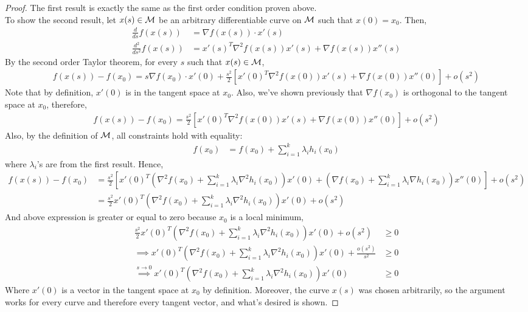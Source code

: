 \documentclass{article}
\begin{document}
   	\begin{proof}
   		The first result is exactly the same as the first order condition proven above. \\
   		To show the second result, let $x(s) \in \mathcal{{M}}$ be an arbitrary differentiable curve on $\mathcal{{M}}$ such that $x(0) = x_0$. Then,
   		\begin{align}
   			\frac{d}{ds} f(x(s)) &= \nabla f(x(s)) \cdot x'(s) \\
   			\frac{d^2}{ds^2} f(x(s)) &= x'(s)^T \nabla^2 f(x(s)) x'(s) + \nabla f(x(s)) x''(s)
   		\end{align}
   		By the second order Taylor theorem, for every $s$ such that $x(s) \in \mathcal{{M}}$, 
   		\begin{align}
   			f(x(s)) - f(x_0) = s \nabla f(x_0) \cdot x'(0) + \frac{s^2}{2} \left[
   			x'(0)^T \nabla^2 f(x(0)) x'(s) + \nabla f(x(0)) x''(0)
   			\right] + o(s^2)
   		\end{align}
   		Note that by definition, $x'(0)$ is in the tangent space at $x_0$. Also, we've shown previously that $\nabla f(x_0)$ is orthogonal to the tangent space at $x_0$, therefore,
   		\begin{align}
   			f(x(s)) - f(x_0) = \frac{s^2}{2} \left[
   			x'(0)^T \nabla^2 f(x(0)) x'(s) + \nabla f(x(0)) x''(0)
   			\right] + o(s^2)
   		\end{align}
   		Also, by the definition of $\mathcal{{M}}$, all constraints hold with equality:
   		\begin{align}
   			f(x_0) &= f(x_0) + \sum_{i=1}^k \lambda_i h_i(x_0)
   		\end{align}
   		where $\lambda_i$'s are from the first result. Hence,
   		\begin{align}
   			f(x(s)) - f(x_0) &= \frac{s^2}{2} \left [
   			x'(0)^T \left(\nabla^2 f(x_0) + \sum_{i=1}^k \lambda_i \nabla^2 h_i(x_0)\right) x'(0)
   			+ \left(
   			\nabla f(x_0) + \sum_{i=1}^k \lambda_i \nabla h_i(x_0)
   			\right)x''(0)
   			\right ] + o(s^2) \\
   			&= \frac{s^2}{2} x'(0)^T \left(\nabla^2 f(x_0) + \sum_{i=1}^k \lambda_i \nabla^2 h_i(x_0)\right) x'(0) + o(s^2)
   		\end{align}
   		And above expression is greater or equal to zero because $x_0$ is a local minimum,
   		\begin{align}
   			\frac{s^2}{2} x'(0)^T \left(\nabla^2 f(x_0) + \sum_{i=1}^k \lambda_i \nabla^2 h_i(x_0)\right) x'(0) + o(s^2) &\geq 0 \\
   			\implies x'(0)^T \left(\nabla^2 f(x_0) + \sum_{i=1}^k \lambda_i \nabla^2 h_i(x_0)\right) x'(0) + \frac{o(s^2)}{s^2} &\geq 0 \\
   			\overset{s\to 0}{\implies}x'(0)^T \left(\nabla^2 f(x_0) + \sum_{i=1}^k \lambda_i \nabla^2 h_i(x_0)\right) x'(0) &\geq 0
   		\end{align}
   		Where $x'(0)$ is a vector in the tangent space at $x_0$ by definition. Moreover, the curve $x(s)$ was chosen arbitrarily, so the argument works for every curve and therefore every tangent vector, and what's desired is shown.
   	\end{proof}
   	
\end{document}
